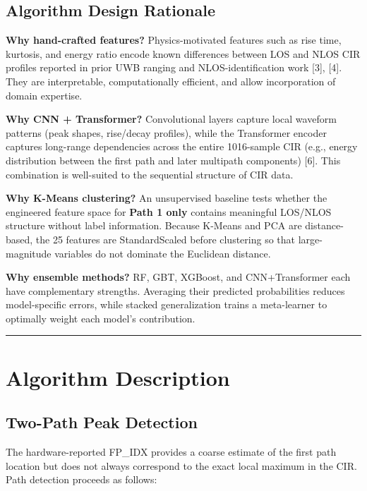 \documentclass[12pt,a4paper]{article}
\begin{document}
\subsection{Algorithm Design
Rationale}\label{algorithm-design-rationale}

\textbf{Why hand-crafted features?} Physics-motivated features such as
rise time, kurtosis, and energy ratio encode known differences between
LOS and NLOS CIR profiles reported in prior UWB ranging and
NLOS-identification work {[}3{]}, {[}4{]}. They are interpretable,
computationally efficient, and allow incorporation of domain expertise.

\textbf{Why CNN + Transformer?} Convolutional layers capture local
waveform patterns (peak shapes, rise/decay profiles), while the
Transformer encoder captures long-range dependencies across the entire
1016-sample CIR (e.g., energy distribution between the first path and
later multipath components) {[}6{]}. This combination is well-suited to
the sequential structure of CIR data.

\textbf{Why K-Means clustering?} An unsupervised baseline tests whether
the engineered feature space for \textbf{Path 1 only} contains
meaningful LOS/NLOS structure without label information. Because K-Means
and PCA are distance-based, the 25 features are StandardScaled before
clustering so that large-magnitude variables do not dominate the
Euclidean distance.

\textbf{Why ensemble methods?} RF, GBT, XGBoost, and CNN+Transformer
each have complementary strengths. Averaging their predicted
probabilities reduces model-specific errors, while stacked
generalization trains a meta-learner to optimally weight each model's
contribution.

\begin{center}\rule{0.5\linewidth}{0.5pt}\end{center}

\section{Algorithm Description}\label{algorithm-description}

\subsection{Two-Path Peak Detection}\label{two-path-peak-detection}

The hardware-reported FP\_IDX provides a coarse estimate of the first
path location but does not always correspond to the exact local maximum
in the CIR. Path detection proceeds as follows:
\end{document}
